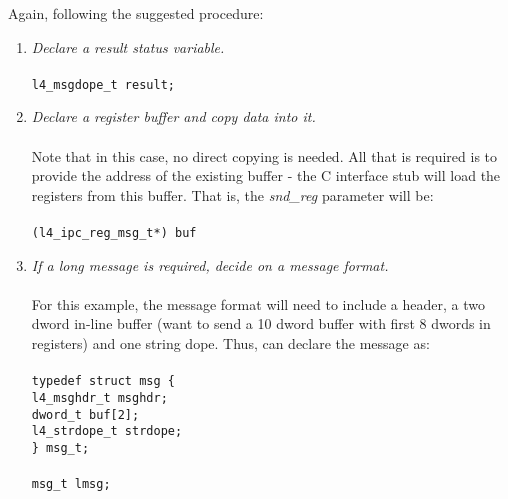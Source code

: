 Again, following the suggested procedure:

\begin{enumerate}

\item \emph{Declare a result status variable.} \\ \\
  \hspace*{20pt} {\footnotesize\verb+l4_msgdope_t result;+}
  
\item \emph{Declare a register buffer and copy data into it.} \\ \\
  \hspace*{10pt} Note that in this case, no direct copying is needed. All
  that is required is to provide the address of the existing buffer -
  the C interface stub will load the registers from this buffer. That is, the
  \emph{snd\_reg} parameter will be: \\ \\
  \hspace*{20pt} {\footnotesize\verb+(l4_ipc_reg_msg_t*) buf +} 
  
\item \emph{If a long message is required, decide on a message format.}
  \\ \\ \hspace*{10pt}
  For this example, the message format will need to include a header,
  a two dword in-line buffer (want to send a 10 dword buffer with first
  8 dwords in registers) and one string dope. Thus, can declare the 
  message as: \\ \\
  \hspace*{20pt} {\footnotesize\verb+typedef struct msg {+} \\
    \hspace*{60pt} {\footnotesize\verb+l4_msghdr_t msghdr;+} \\
    \hspace*{60pt} {\footnotesize\verb+dword_t buf[2];+} \\
    \hspace*{60pt} {\footnotesize\verb+l4_strdope_t strdope;+}\\
    \hspace*{20pt} {\footnotesize\verb+} msg_t;+} \\ \\
  \hspace*{20pt} {\footnotesize\verb+msg_t lmsg;+}


\end{enumerate}
